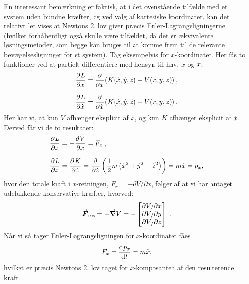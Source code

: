 En interessant bemærkning er faktisk, at i det ovenstående tilfælde med et system uden bundne kræfter, og ved valg af kartesiske koordinater, kan det relativt let vises at Newtons 2. lov giver præcis Euler-Lagrangeligningerne (hvilket forhåbentligt også skulle være tilfældet, da det er ækvivalente løsningsmetoder, som begge kan bruges til at komme frem til de relevante bevægelsesligninger for et system). Tag eksempelvis for $x$-koordinatet. Her fås to funktioner ved at partielt differentiere med hensyn til hhv. $x$ og $\dt{x}$:
%
\begin{align}
	\pdif{x}{L} &= \pdif{x}{}(K(\dt{x},\dt{y},\dt{z}) - V(x,y,z) ) \: , \\[0.75em]
	\pdif{\dt{x}}{L} &= \pdif{\dt{x}}{} (K(\dt{x},\dt{y},\dt{z}) - V(x,y,z) ) \: .
\end{align}
%
Her har vi, at kun $V$ afhænger eksplicit af $x$, og kun $K$ afhænger eksplicit af $\dt{x}$. Derved får vi de to resultater:
%
\begin{align}
	\pdif{x}{L} &= - \pdif{x}{V} = F_x \: , \\[0.75em]
	\pdif{\dt{x}}{L} &= \pdif{\dt{x}}{K} = \pdif{\dt{x}}{}\left(\frac{1}{2} m \left(\dt{x}^2+\dt{y}^2+\dt{z}^2\right)\right) = m\dt{x} = p_x,
\end{align}
%
hvor den totale kraft i $x$-retningen, $F_x = -\partial V/\partial x$, følger af at vi har antaget udelukkende konservative kræfter, hvorved:
%
\begin{align}
\subv{F}{res} = - \grad{V} = -\xyz{\partial V / \partial x}{\partial V / \partial y}{\partial V / \partial z} \: .
\end{align}
%
Når vi så tager Euler-Lagrangeligningen for $x$-koordinatet fåes
%
\begin{align}
	F_x = \dif{t}{p_x} = m\ddt{x},
\end{align}
%
hvilket er præcis Newtons 2. lov taget for $x$-komposanten af den resulterende kraft.

